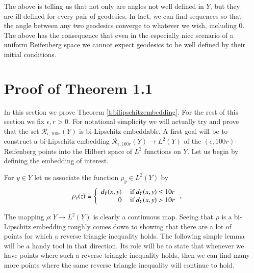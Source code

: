 \documentclass[11pt]{article}
\newcommand{\cR}{\mathcal{R}}
\begin{document}
The above is telling us that not only are angles not well defined in $Y$, but they are ill-defined for every pair of geodesics.  In fact, we can find sequences so that the angle between any two geodesics converge to whatever we wish, including $0$.  The above has the consequence that even in the especially nice scenario of a uniform Reifenberg space we cannot expect geodesics to be well defined by their initial conditions.



\section{Proof of Theorem 1.1}\label{s:Proof_BilipEmbed}

In this section we prove Theorem \ref{t:bilipschitzembedding}.  For the rest of this section we fix $\epsilon,r>0$.  For notational simplicity we will actually try and prove that the set $\cR_{\epsilon,100r}(Y)$ is bi-Lipschitz embeddable.  A first goal will be to construct a bi-Lipschitz embedding $\cR_{\epsilon,100r}(Y)\to L^2(Y)$ of the $(\epsilon,100r)$-Reifenberg points into the Hilbert space of $L^2$ functions on $Y$.  Let us begin by defining the embedding of interest.

\begin{definition}
 For $y\in Y$ let us associate the function $\rho_y\in L^2(Y)$ by
\begin{align}
\rho_y(z)\equiv \left\{ \begin{array}{rl}
  d_Y(x,y) &\mbox{ if } d_Y(x,y)\leq 10r \notag\\
  0 &\mbox{ if } d_Y(x,y)>10r
       \end{array} \right. ,\,
\end{align}
\end{definition}

The mapping $\rho:Y\to L^2(Y)$ is clearly a continuous map.  Seeing that $\rho$ is a bi-Lipschitz embedding roughly comes down to showing that there are a lot of points for which a reverse triangle inequality holds.  The following simple lemma will be a handy tool in that direction.  Its role will be to state that whenever we have points  where such a reverse triangle inequality holds, then we can find many more points where the same reverse triangle inequality will continue to hold.
\end{document}
